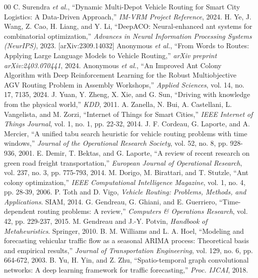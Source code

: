 \documentclass[conference]{IEEEtran}
\begin{document}
\begin{thebibliography}{00}
C. Surendra \textit{et al.}, ``Dynamic Multi-Depot Vehicle Routing for Smart City Logistics: A Data-Driven Approach,'' \emph{IM-VRM Project Reference}, 2024.
H. Ye, J. Wang, Z. Cao, H. Liang, and Y. Li, ``DeepACO: Neural-enhanced ant systems for combinatorial optimization,'' \emph{Advances in Neural Information Processing Systems (NeurIPS)}, 2023. [arXiv:2309.14032]
Anonymous \textit{et al.}, ``From Words to Routes: Applying Large Language Models to Vehicle Routing,'' \emph{arXiv preprint arXiv:2403.070441}, 2024.
Anonymous \textit{et al.}, ``An Improved Ant Colony Algorithm with Deep Reinforcement Learning for the Robust Multiobjective AGV Routing Problem in Assembly Workshops,'' \emph{Applied Sciences}, vol. 14, no. 17, 7135, 2024.
J. Yuan, Y. Zheng, X. Xie, and G. Sun, ``Driving with knowledge from the physical world,'' \emph{KDD}, 2011.
A. Zanella, N. Bui, A. Castellani, L. Vangelista, and M. Zorzi, ``Internet of Things for Smart Cities,'' \emph{IEEE Internet of Things Journal}, vol. 1, no. 1, pp. 22-32, 2014.
J. F. Cordeau, G. Laporte, and A. Mercier, ``A unified tabu search heuristic for vehicle routing problems with time windows,'' \emph{Journal of the Operational Research Society}, vol. 52, no. 8, pp. 928-936, 2001.
E. Demir, T. Bektas, and G. Laporte, ``A review of recent research on green road freight transportation,'' \emph{European Journal of Operational Research}, vol. 237, no. 3, pp. 775-793, 2014.
M. Dorigo, M. Birattari, and T. Stutzle, ``Ant colony optimization,'' \emph{IEEE Computational Intelligence Magazine}, vol. 1, no. 4, pp. 28-39, 2006.
P. Toth and D. Vigo, \emph{Vehicle Routing: Problems, Methods, and Applications}. SIAM, 2014.
G. Gendreau, G. Ghiani, and E. Guerriero, ``Time-dependent routing problems: A review,'' \emph{Computers \& Operations Research}, vol. 42, pp. 229-237, 2015.
M. Gendreau and J.-Y. Potvin, \emph{Handbook of Metaheuristics}. Springer, 2010.
B. M. Williams and L. A. Hoel, ``Modeling and forecasting vehicular traffic flow as a seasonal ARIMA process: Theoretical basis and empirical results,'' \emph{Journal of Transportation Engineering}, vol. 129, no. 6, pp. 664-672, 2003.
B. Yu, H. Yin, and Z. Zhu, ``Spatio-temporal graph convolutional networks: A deep learning framework for traffic forecasting,'' \emph{Proc. IJCAI}, 2018.

\end{thebibliography}
\end{document}
